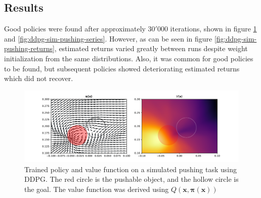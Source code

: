\subsection{Results}

Good policies were found after approximately $30'000$ iterations, shown in
figure \ref{fig:ddpg-sim-pushing-pi-v} and \ref{fig:ddpg-sim-pushing-series}.
However, as can be seen in figure \ref{fig:ddpg-sim-pushing-returns}, estimated
returns varied greatly between runs despite weight initialization from the same
distributions. Also, it was common for good policies to be found, but
subsequent policies showed deteriorating estimated returns which did not
recover.

\begin{figure}[h!]
    \centering
    \includegraphics[width=1.0 \textwidth]{res/ddpg-pushing-pi-v.pdf}

    \caption{Trained policy and value function on a simulated pushing task
    using DDPG. The red circle is the pushable object, and the hollow circle is
    the goal. The value function was derived using $Q(\mathbf{x, \pi(x)})$}

    \label{fig:ddpg-sim-pushing-pi-v}

\end{figure}

